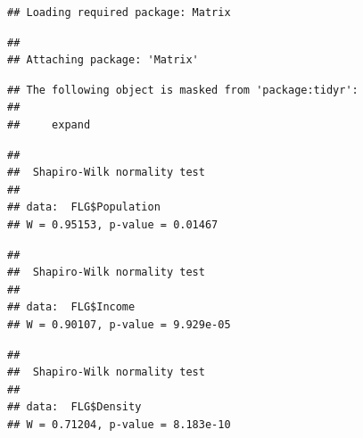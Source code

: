 \documentclass[12pt,]{article}
\newenvironment{Shaded}{\begin{snugshade}}{\end{snugshade}}
\newcommand{\KeywordTok}[1]{\textcolor[rgb]{0.13,0.29,0.53}{\textbf{#1}}}
\newcommand{\CommentTok}[1]{\textcolor[rgb]{0.56,0.35,0.01}{\textit{#1}}}
\newcommand{\OperatorTok}[1]{\textcolor[rgb]{0.81,0.36,0.00}{\textbf{#1}}}
\newcommand{\NormalTok}[1]{#1}
\begin{document}
\begin{verbatim}
## Loading required package: Matrix
\end{verbatim}

\begin{verbatim}
## 
## Attaching package: 'Matrix'
\end{verbatim}

\begin{verbatim}
## The following object is masked from 'package:tidyr':
## 
##     expand
\end{verbatim}

\begin{Shaded}
\end{Shaded}

\begin{verbatim}
## 
##  Shapiro-Wilk normality test
## 
## data:  FLG$Population
## W = 0.95153, p-value = 0.01467
\end{verbatim}

\begin{Shaded}
\end{Shaded}

\begin{verbatim}
## 
##  Shapiro-Wilk normality test
## 
## data:  FLG$Income
## W = 0.90107, p-value = 9.929e-05
\end{verbatim}

\begin{Shaded}
\end{Shaded}

\begin{verbatim}
## 
##  Shapiro-Wilk normality test
## 
## data:  FLG$Density
## W = 0.71204, p-value = 8.183e-10
\end{verbatim}

\begin{Shaded}
\end{Shaded}
\end{document}
